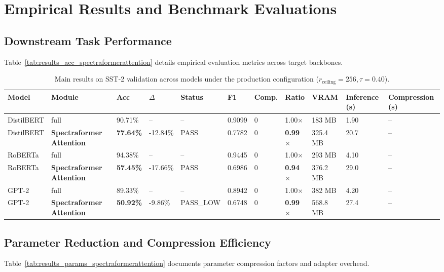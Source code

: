 \section{Empirical Results and Benchmark Evaluations}

\subsection{Downstream Task Performance}
Table~\ref{tab:results_acc_spectraformerattention} details empirical evaluation metrics across target backbones.

\begin{table}[t]
\centering
\small
\begin{tabular}{lllllllllll}
\toprule
\textbf{Model} & \textbf{Module} & \textbf{Acc} & \textbf{$\Delta$} & \textbf{Status} & \textbf{F1} & \textbf{Comp.} & \textbf{Ratio} & \textbf{VRAM} & \textbf{Inference (s)} & \textbf{Compression (s)} \\
\midrule
DistilBERT & full & 90.71\% & -- & -- & 0.9099 & 0 & 1.00$\times$ & 183 MB & 1.90 & -- \\
DistilBERT & \textbf{Spectraformer Attention} & \textbf{77.64\%} & -12.84\% & PASS & 0.7782 & 0 & \textbf{0.99$\times$} & 325.4 MB & 20.7 & -- \\
RoBERTa & full & 94.38\% & -- & -- & 0.9445 & 0 & 1.00$\times$ & 293 MB & 4.10 & -- \\
RoBERTa & \textbf{Spectraformer Attention} & \textbf{57.45\%} & -17.66\% & PASS & 0.6986 & 0 & \textbf{0.94$\times$} & 376.2 MB & 29.0 & -- \\
GPT-2 & full & 89.33\% & -- & -- & 0.8942 & 0 & 1.00$\times$ & 382 MB & 4.20 & -- \\
GPT-2 & \textbf{Spectraformer Attention} & \textbf{50.92\%} & -9.86\% & PASS_LOW & 0.6748 & 0 & \textbf{0.99$\times$} & 568.8 MB & 27.4 & -- \\
\bottomrule
\end{tabular}
\caption{Main results on SST-2 validation across models under the production configuration ($r_{\mathrm{ceiling}}=256, \tau=0.40$).}
\label{tab:main_sst2}
\end{table}

\subsection{Parameter Reduction and Compression Efficiency}
Table~\ref{tab:results_params_spectraformerattention} documents parameter compression factors and adapter overhead.

